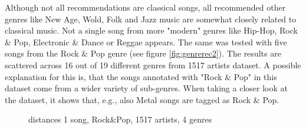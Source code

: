 \noindent Although not all recommendations are classical songs, all recommended other genres like New Age, Wold, Folk and Jazz music are somewhat closely related to classical music.  Not a single song from more "modern" genres like Hip-Hop, Rock \& Pop, Electronic \& Dance or Reggae appears.
\noindent The same was tested with five songs from the Rock \& Pop genre (see figure \ref{fig:genrerec2}). The results are scattered across 16 out of 19 different genres from 1517 artists dataset. A possible explanation for this is, that the songs annotated with "Rock \& Pop" in this dataset come from a wider variety of sub-genres. When taking a closer look at the dataset, it shows that, e.g., also Metal songs are tagged as Rock \& Pop.\\
\begin{figure}[htbp]
	\centering
	\caption{distances 1 song, Rock\&Pop, 1517 artists, 4 genres}
	\label{fig:corr5}
\end{figure}
\FloatBarrier

